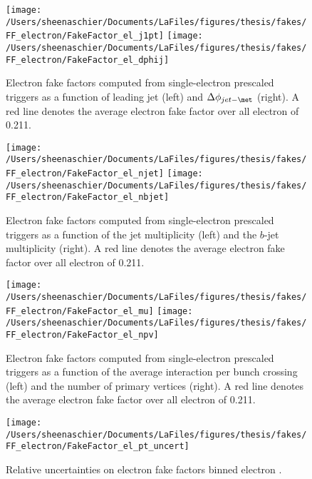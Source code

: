 \begin{figure}[tbp]
  \centering
  \texttt{[image: /Users/sheenaschier/Documents/LaFiles/figures/thesis/fakes/FF\_electron/FakeFactor\_el\_j1pt]}
  \texttt{[image: /Users/sheenaschier/Documents/LaFiles/figures/thesis/fakes/FF\_electron/FakeFactor\_el\_dphij]}\\
  \caption{Electron fake factors computed from single-electron prescaled triggers as a function of leading jet \pt{} (left) and $\Delta\phi_{jet-\met}$ (right). A red line denotes the average electron fake factor over all electron \pt{} of 0.211.}
  \label{fig:elec_FF_hadronic}
\end{figure}

\begin{figure}[tbp]
  \centering
  \texttt{[image: /Users/sheenaschier/Documents/LaFiles/figures/thesis/fakes/FF\_electron/FakeFactor\_el\_njet]}
  \texttt{[image: /Users/sheenaschier/Documents/LaFiles/figures/thesis/fakes/FF\_electron/FakeFactor\_el\_nbjet]}\\
  \caption{Electron fake factors computed from single-electron prescaled triggers as a function of the jet multiplicity (left) and the $b$-jet multiplicity (right). A red line denotes the average electron fake factor over all electron \pt{} of 0.211.}
  \label{fig:elec_FF_njet}
\end{figure}


\begin{figure}[tbp]
  \centering
  \texttt{[image: /Users/sheenaschier/Documents/LaFiles/figures/thesis/fakes/FF\_electron/FakeFactor\_el\_mu]}
  \texttt{[image: /Users/sheenaschier/Documents/LaFiles/figures/thesis/fakes/FF\_electron/FakeFactor\_el\_npv]}\\
  \caption{Electron fake factors computed from single-electron prescaled triggers as a function of the average interaction per bunch crossing (left) and the number of primary vertices (right). A red line denotes the average electron fake factor over all electron \pt{} of 0.211.}
  \label{fig:elec_FF_pileup}
\end{figure}

\begin{figure}[tbp]
  \centering
  \texttt{[image: /Users/sheenaschier/Documents/LaFiles/figures/thesis/fakes/FF\_electron/FakeFactor\_el\_pt\_uncert]}\\
  \caption{Relative uncertainties on electron fake factors binned electron \pt{}.}
  \label{fig:elec_FF_rel_uncert}
\end{figure}
 \FloatBarrier
